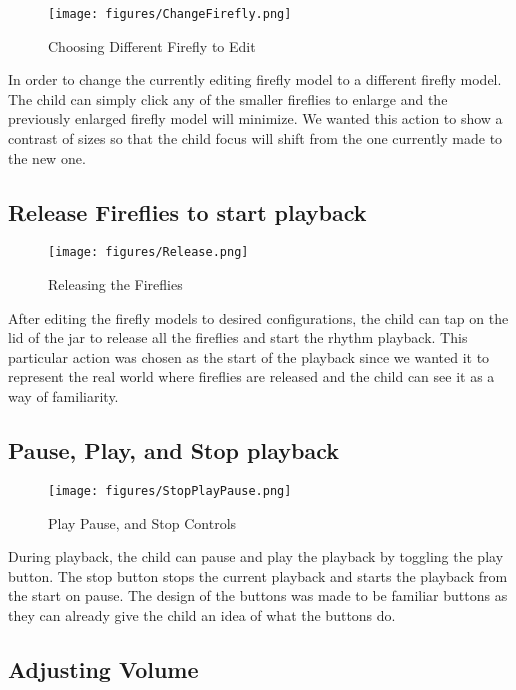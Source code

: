 \begin{figure}[H]
    \centering
    \texttt{[image: figures/ChangeFirefly.png]}
    \caption{Choosing Different Firefly to Edit}
    \label{fig:firefly2}
\end{figure}

In order to change the currently editing firefly model to a different firefly model. The child can simply click any of the smaller fireflies to enlarge and the previously enlarged firefly model will minimize. We wanted this action to show a contrast of sizes so that the child focus will shift from the one currently made to the new one.

\subsection{Release Fireflies to start playback}

\begin{figure}[H]
    \centering
    \texttt{[image: figures/Release.png]}
    \caption{Releasing the Fireflies}
    \label{fig:releaseFirefly}
\end{figure}

After editing the firefly models to desired configurations, the child can tap on the lid of the jar to release all the fireflies and start the rhythm playback. This particular action was chosen as the start of the playback since we wanted it to represent the real world where fireflies are released and the child can see it as a way of familiarity.

\subsection{Pause, Play, and Stop playback}

\begin{figure}[H]
    \centering
    \texttt{[image: figures/StopPlayPause.png]}
    \caption{Play Pause, and Stop Controls}
    \label{fig:firefly2}
\end{figure}

During playback, the child can pause and play the playback by toggling the play button. The stop button stops the current playback and starts the playback from the start on pause. The design of the buttons was made to be familiar buttons as they can already give the child an idea of what the buttons do.
 
\subsection{Adjusting Volume}

